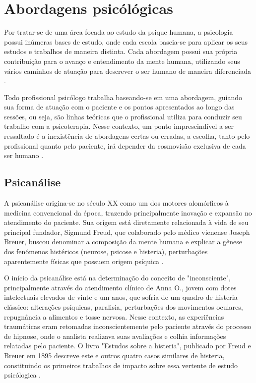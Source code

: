 \section{Abordagens psicólógicas}
\label{sec:abordagensPsicologicas}

Por tratar-se de uma área focada ao estudo da psique humana, a psicologia possui inúmeras bases de estudo, onde cada escola baseia-se para aplicar os seus estudos e trabalhos de maneira distinta. Cada abordagem possui sua própria contribuição para o avanço e entendimento da mente humana, utilizando seus vários caminhos de atuação para descrever o ser humano de maneira diferenciada \cite{Anhanguera2022}.

Todo profissional psicólogo trabalha baseando-se em uma abordagem, guiando sua forma de atuação com o paciente e os pontos apresentados ao longo das sessões, ou seja, são linhas teóricas que o profissional utiliza para conduzir seu trabalho com a psicoterapia. Nesse contexto, um ponto imprescindível a ser ressaltado é a inexistência de abordagens certas ou erradas, a escolha, tanto pelo profissional quanto pelo paciente, irá depender da cosmovisão exclusiva de cada ser humano \cite{Barros2022}.

\subsection{Psicanálise}
\label{sec:psicanalise}
A psicanálise origina-se no século XX como um dos motores alomórficos à medicina convencional da época, trazendo principalmente inovação e expansão no atendimento do paciente. Sua origem está diretamente relacionada à vida de seu principal fundador, Sigmund Freud, que colaborado pelo médico vienense Joseph Breuer, buscou denominar a composição da mente humana e explicar a gênese dos fenômenos histéricos (neurose, psicose e histeria), perturbações aparentemente físicas que possuem origem psíquica \cite{Clinica2017}.

O início da psicanálise está na determinação do conceito de "inconsciente", principalmente através do atendimento clínico de Anna O., jovem com dotes intelectuais elevados de vinte e um anos, que sofria de um quadro de histeria clássico: alterações psíquicas, paralisia, perturbações dos movimentos oculares, repugnância a alimentos e tosse nervosa. Nesse contexto, as experiências traumáticas eram retomadas inconscientemente pelo paciente através do processo de hipnose, onde o analista realizava suas avaliações e colhia informações relatadas pelo paciente. O livro "Estudos sobre a histeria", publicado por Freud e Breuer em 1895 descreve este e outros quatro casos similares de histeria, constituindo os primeiros trabalhos de impacto sobre essa vertente de estudo psicólogica \cite{Clinica2017}.

